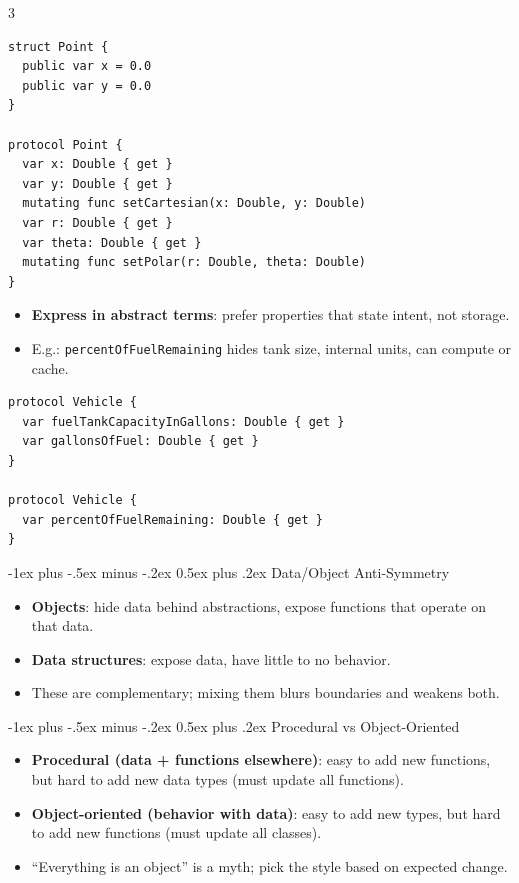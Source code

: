 \documentclass[a4paper, 9pt, landscape]{extarticle}
\makeatletter
\renewcommand{\subsection}{\@startsection{subsubsection}{3}{0mm}%
                                {-1ex plus -.5ex minus -.2ex}%
                                {0.5ex plus .2ex}%
                                {\normalfont\small\bfseries}}
\renewcommand{\subsubsection}{\@startsection{paragraph}{4}{0mm}%
                                {-1ex plus -.5ex minus -.2ex}%
                                {0.5ex plus .2ex}%
                                {\normalfont\footnotesize\bfseries}} %
\makeatother
\begin{document}
\begin{multicols*}{3}
\begin{verbatim}
struct Point {
  public var x = 0.0
  public var y = 0.0
}

protocol Point {
  var x: Double { get }
  var y: Double { get }
  mutating func setCartesian(x: Double, y: Double)
  var r: Double { get }
  var theta: Double { get }
  mutating func setPolar(r: Double, theta: Double)
}
\end{verbatim}

\begin{itemize}
  \item \textbf{Express in abstract terms}: prefer properties that state intent, not storage.
  \item E.g.: \texttt{percentOfFuelRemaining} hides tank size, internal units, can compute or cache.
\end{itemize}

\begin{verbatim}
protocol Vehicle {
  var fuelTankCapacityInGallons: Double { get }
  var gallonsOfFuel: Double { get }
}

protocol Vehicle {
  var percentOfFuelRemaining: Double { get }
}
\end{verbatim}

\subsection{Data/Object Anti-Symmetry}
\begin{itemize}
  \item \textbf{Objects}: hide data behind abstractions, expose functions that operate on that data.
  \item \textbf{Data structures}: expose data, have little to no behavior.
  \item These are complementary; mixing them blurs boundaries and weakens both.
\end{itemize}

\subsubsection{Procedural vs Object-Oriented}
\begin{itemize}
  \item \textbf{Procedural (data + functions elsewhere)}: easy to add new functions, but hard to add new data types (must update all functions).
  \item \textbf{Object-oriented (behavior with data)}: easy to add new types, but hard to add new functions (must update all classes).
  \item ``Everything is an object'' is a myth; pick the style based on expected change.
\end{itemize}


\end{multicols*}
\end{document}

